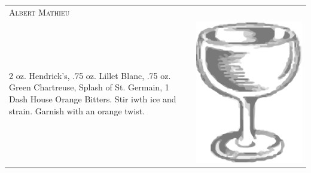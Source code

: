 \documentclass{article}
\begin{document}
\begin{tabular}{p{2in} p{0.5in}}
	\multicolumn{2}{p{3in}}{\centering\Huge\textsc{Albert Mathieu}}\\ 
	  \vspace{-0.1in} 2 oz. Hendrick's, .75 oz. Lillet Blanc, .75 oz. Green Chartreuse, Splash of St. Germain, 1 Dash House Orange Bitters. Stir iwth ice and strain. Garnish with an orange twist. &
	  \vspace{-0.1in} \includegraphics{coupe.png}
\end{tabular}\\
\end{document}
